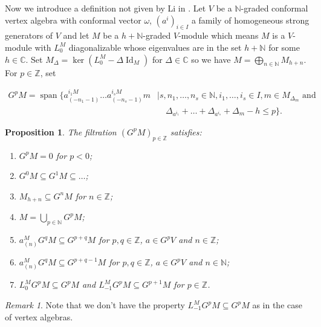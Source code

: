 \documentclass[a4paper, 12pt, reqno]{amsart}
\newtheorem{proposition}[theorem]{Proposition}
\theoremstyle{remark}
\newtheorem{remark}[theorem]{Remark}
\DeclareMathOperator{\Id}{Id}
\DeclareMathOperator{\vspan}{span}
\begin{document}
Now we introduce a definition not given by Li in \cite{li_vertex_2004}.
Let $V$ be a $\mathbb{N}$-graded conformal vertex algebra with conformal vector $\omega$, $(a^i)_{i \in I}$ a family of homogeneous strong generators of $V$ and let $M$ be a $h + \mathbb{N}$-graded $V$-module which means $M$ is a $V$-module with $L_0^M$ diagonalizable whose eigenvalues are in the set $h + \mathbb{N}$ for some $h \in \mathbb{C}$.
Set $M_\Delta = \ker(L^M_0 - \Delta\Id_M)$ for $\Delta \in \mathbb{C}$ so we have $M = \bigoplus_{n \in \mathbb{N}}M_{h + n}$.
For $p \in \mathbb{Z}$, set

\begin{equation*}
  \begin{split}
    G^pM = \vspan\{a^{i_1M}_{(-n_1 - 1)}\dots a^{i_sM}_{(-n_s - 1)}m &\mid s, n_1, \dots, n_s \in \mathbb{N}, i_1, \dots, i_s \in I, m \in M_{\Delta_m} \text{ and }\\
    &\quad \Delta_{a^{i_1}} + \dots + \Delta_{a^{i_s}} + \Delta_m - h \le p\}.
  \end{split}
\end{equation*}

\begin{proposition}
  \label{prp:5}
  The filtration $(G^pM)_{p \in \mathbb{Z}}$ satisfies:
  \begin{enumerate}
  \item $G^pM = 0$ for $p < 0$;
  \item $G^0M \subseteq G^1M \subseteq \dots$;
  \item $M_{h + n} \subseteq G^nM$ for $n \in \mathbb{Z}$;
  \item $M = \bigcup_{p \in \mathbb{N}}G^pM$;
  \item $a^M_{(n)}G^qM \subseteq G^{p + q}M$ for $p, q \in \mathbb{Z}$, $a \in G^pV$ and $n \in \mathbb{Z}$;
  \item $a^M_{(n)}G^qM \subseteq G^{p + q - 1}M$ for $p, q \in \mathbb{Z}$, $a \in G^pV$ and $n \in \mathbb{N}$;
  \item $L^M_0G^pM \subseteq G^pM$ and $L^M_{-1}G^pM \subseteq G^{p + 1}M$ for $p \in \mathbb{Z}$.
  \end{enumerate}
\end{proposition}

\begin{remark}
  \label{rmk:3}
  Note that we don't have the property $L_{-1}^MG^pM \subseteq G^pM$ as in the case of vertex algebras.
\end{remark}
\end{document}
